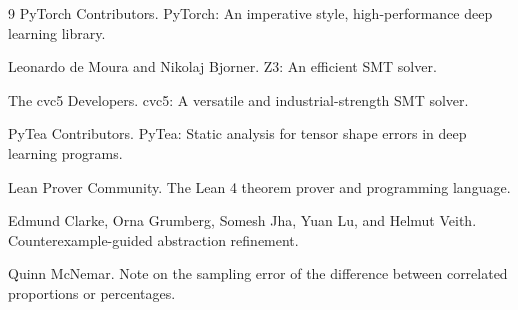 \documentclass[11pt]{article}
\begin{document}
\begin{thebibliography}{9}
PyTorch Contributors.
\newblock PyTorch: An imperative style, high-performance deep learning library.

Leonardo de Moura and Nikolaj Bjorner.
\newblock Z3: An efficient SMT solver.

The cvc5 Developers.
\newblock cvc5: A versatile and industrial-strength SMT solver.

PyTea Contributors.
\newblock PyTea: Static analysis for tensor shape errors in deep learning
programs.

Lean Prover Community.
\newblock The Lean 4 theorem prover and programming language.

Edmund Clarke, Orna Grumberg, Somesh Jha, Yuan Lu, and Helmut Veith.
\newblock Counterexample-guided abstraction refinement.

Quinn McNemar.
\newblock Note on the sampling error of the difference between correlated
proportions or percentages.
\end{thebibliography}
\end{document}
